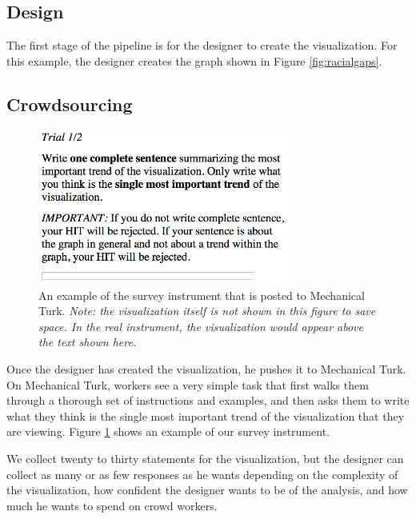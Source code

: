 \documentclass{sigchi}
\begin{document}
\subsection{Design}

The first stage of the pipeline is for the designer to create the
visualization. For this example, the designer creates the graph shown
in Figure \ref{fig:racialgaps}.

\subsection{Crowdsourcing}

\begin{figure}[t]
  \begin{framed}
  \begin{center}
    \includegraphics[width=3.33in]{figures/instrument.png}
  \end{center}
  \end{framed}
  \caption{An example of the survey instrument that is posted to Mechanical Turk. \textit{Note: the visualization itself is not shown in this figure to save space. In the real instrument, the visualization would appear above the text shown here.}}
  \label{fig:instrument}
\end{figure}

Once the designer has created the visualization, he pushes it to
Mechanical Turk. On Mechanical Turk, workers see a very simple task
that first walks them through a thorough set of instructions and
examples, and then asks them to write what they think is the single
most important trend of the visualization that they are viewing.
Figure \ref{fig:instrument} shows an example of our survey instrument.

We collect twenty to thirty statements for the visualization, but the
designer can collect as many or as few responses as he wants depending
on the complexity of the visualization, how confident the designer
wants to be of the analysis, and how much he wants to spend on crowd
workers.
\end{document}
